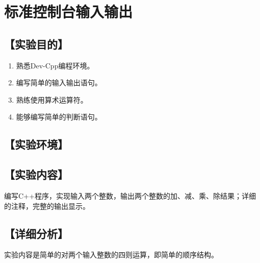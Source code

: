 \section{标准控制台输入输出}
\hfill{}

\subsection*{【实验目的】}
\begin{enumerate}[topsep=0pt,partopsep=0pt,itemsep=0pt,parsep=0pt,label={\arabic*、}]
\item 熟悉Dev-Cpp编程环境。
\item 编写简单的输入输出语句。
\item 熟练使用算术运算符。
\item 能够编写简单的判断语句。
\end{enumerate}
\subsection*{【实验环境】}
\MyEnvironment
\subsection*{【实验内容】}
编写C++程序，实现输入两个整数，输出两个整数的加、减、乘、除结果；详细的注释，完整的输出显示。
\subsection*{【详细分析】}
实验内容是简单的对两个输入整数的四则运算，即简单的顺序结构。

